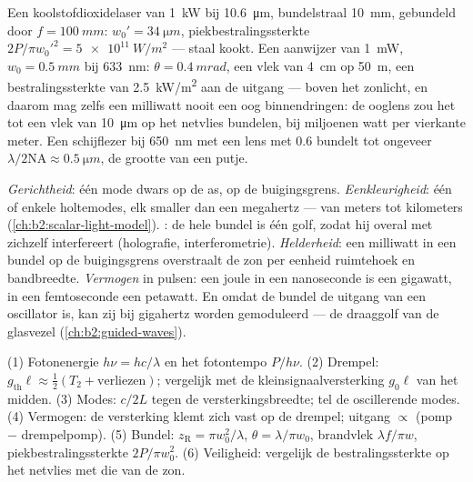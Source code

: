 \begin{example}\label{ex:b2:laser:focus}
Een koolstofdioxidelaser van \qty{1}{kW} bij \qty{10.6}{\micro m}, bundelstraal
\qty{10}{mm}, gebundeld door $f = \qty{100}{mm}$: $w_0' = \qty{34}{\micro m}$,
piekbestralingssterkte $2P/\pi w_0'^2 = \qty{5e11}{W/m^2}$ --- staal kookt.
Een aanwijzer van \qty{1}{mW}, $w_0 = \qty{0.5}{mm}$ bij \qty{633}{nm}:
$\theta =
\qty{0.4}{mrad}$, een vlek van \qty{4}{cm} op \qty{50}{m}, een
bestralingssterkte van
\qty{2.5}{kW/m^2} aan de uitgang --- boven het zonlicht, en daarom mag zelfs een
milliwatt nooit een oog binnendringen: de ooglens zou het tot een
vlek van \qty{10}{\micro m} op het netvlies bundelen, bij miljoenen watt per
vierkante
meter. Een schijflezer bij \qty{650}{nm} met een lens met 
$0.6$ bundelt tot ongeveer $\lambda/2\mathrm{NA} \approx \qty{0.5}{\micro m}$,
de grootte van een putje.
\end{example}

\begin{remark}\label{rem:b2:laser:special}
\emph{Gerichtheid}: één mode dwars op de as,  op de
buigingsgrens. \emph{Eenkleurigheid}: één of enkele holtemodes, elk
smaller dan een megahertz ---  van meters tot kilometers
(\cref{ch:b2:scalar-light-model}). \emph{}: de hele
bundel is één golf, zodat hij overal met zichzelf interfereert (holografie,
interferometrie). \emph{Helderheid}: een milliwatt in een bundel op de buigingsgrens
overstraalt de zon per eenheid ruimtehoek en bandbreedte. \emph{Vermogen}
in pulsen: een joule in een nanoseconde is een gigawatt, in een femtoseconde een
petawatt. En omdat de bundel de uitgang van een oscillator is, kan zij
bij gigahertz worden gemoduleerd --- de draaggolf van de glasvezel
(\cref{ch:b2:guided-waves}).
\end{remark}

\begin{method}[Laserschattingen]\label{meth:b2:laser:method}
(1) Fotonenergie $h\nu = hc/\lambda$ en het fotontempo $P/h\nu$.
(2) Drempel: $g_{\text{th}}\ell \approx \tfrac12(T_2 + \text{verliezen})$;
vergelijk met de kleinsignaalversterking $g_0\ell$ van het midden.
(3) Modes: $c/2L$ tegen de versterkingsbreedte; tel de oscillerende modes.
(4) Vermogen: de versterking klemt zich vast op de drempel; uitgang
$\propto$ (pomp $-$
drempelpomp). (5) Bundel: $z_{\text{R}} = \pi w_0^2/\lambda$,
$\theta =
\lambda/\pi w_0$, brandvlek $\lambda f/\pi w$,
piekbestralingssterkte
$2P/\pi w_0^2$. (6) Veiligheid: vergelijk de bestralingssterkte op het
netvlies met die van
de zon.
\end{method}

